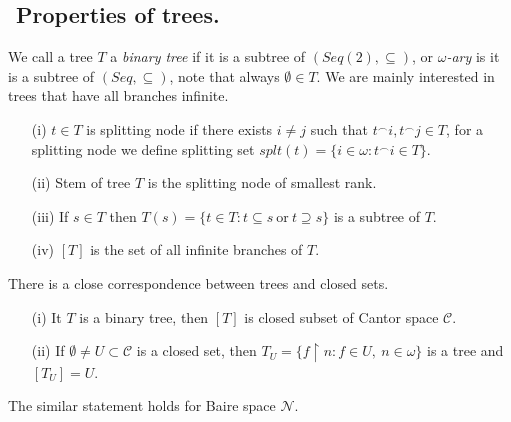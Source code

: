 \subsection{${}$ \hspace{-1em}Properties of trees.}
We call a tree $T$ a \emph{binary tree} if it is a subtree
of  $(Seq(2),\subseteq)$, or \emph{$\omega$-ary}
is it is a subtree of $(Seq,\subseteq)$, note that always $\emptyset \in T$.
We are mainly interested in trees that have all branches infinite.
\begin{itemize}
 \item[(i)] $t \in T$ is splitting node if there exists $i \not = j$
	such that $t^\smallfrown i, t^\smallfrown j \in T$, for
	a splitting node we define splitting set
	$splt(t) = \{i \in \omega : t^\smallfrown i \in T\}$.
 \item[(ii)] Stem of tree $T$ is the splitting node of smallest rank.
 \item[(iii)] If $s \in T$ then $T(s) = \{t \in T : t \subseteq s \ \mbox{or} \
	 t \supseteq s \}$
	is a subtree of $T$.
 \item[(iv)] $[T]$ is the set of all infinite branches of $T$.
\end{itemize}


There is a close correspondence between trees and closed sets.

\begin{fact}
\begin{itemize}
 \item[(i)] It $T$ is a binary tree, then $[T]$ is closed subset of Cantor space $\mathcal C$.
 \item[(ii)] If $\emptyset \not = U \subset \mathcal C$ is a closed set, then
	$T_U = \{f \upharpoonright n : f \in U, \ n \in \omega \}$
	is a tree and $[T_U] = U$.
\end{itemize}
The similar statement holds for Baire space $\mathcal N$.
\end{fact}

